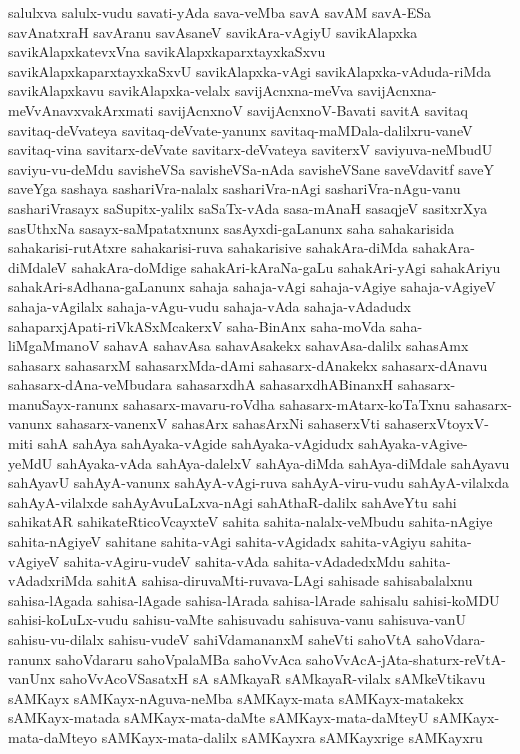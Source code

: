{salulxva
salulx-vudu
savati-yAda
sava-veMba
savA
savAM
savA-ESa
savAnatxraH
savAranu
savAsaneV
savikAra-vAgiyU
savikAlapxka
savikAlapxkatevxVna
savikAlapxkaparxtayxkaSxvu
savikAlapxkaparxtayxkaSxvU
savikAlapxka-vAgi
savikAlapxka-vAduda-riMda
savikAlapxkavu
savikAlapxka-velalx
savijAcnxna-meVva
savijAcnxna-meVvAnavxvakArxmati
savijAcnxnoV
savijAcnxnoV-Bavati
savitA
savitaq
savitaq-deVvateya
savitaq-deVvate-yanunx
savitaq-maMDala-dalilxru-vaneV
savitaq-vina
savitarx-deVvate
savitarx-deVvateya
saviterxV
saviyuva-neMbudU
saviyu-vu-deMdu
savisheVSa
savisheVSa-nAda
savisheVSane
saveVdavitf
saveY
saveYga
sashaya
sashariVra-nalalx
sashariVra-nAgi
sashariVra-nAgu-vanu
sashariVrasayx
saSupitx-yalilx
saSaTx-vAda
sasa-mAnaH
sasaqjeV
sasitxrXya
sasUthxNa
sasayx-saMpatatxnunx
sasAyxdi-gaLanunx
saha
sahakarisida
sahakarisi-rutAtxre
sahakarisi-ruva
sahakarisive
sahakAra-diMda
sahakAra-diMdaleV
sahakAra-doMdige
sahakAri-kAraNa-gaLu
sahakAri-yAgi
sahakAriyu
sahakAri-sAdhana-gaLanunx
sahaja
sahaja-vAgi
sahaja-vAgiye
sahaja-vAgiyeV
sahaja-vAgilalx
sahaja-vAgu-vudu
sahaja-vAda
sahaja-vAdadudx
sahaparxjApati-riVkASxMcakerxV
saha-BinAnx
saha-moVda
saha-liMgaMmanoV
sahavA
sahavAsa
sahavAsakekx
sahavAsa-dalilx
sahasAmx
sahasarx
sahasarxM
sahasarxMda-dAmi
sahasarx-dAnakekx
sahasarx-dAnavu
sahasarx-dAna-veMbudara
sahasarxdhA
sahasarxdhABinanxH
sahasarx-manuSayx-ranunx
sahasarx-mavaru-roVdha
sahasarx-mAtarx-koTaTxnu
sahasarx-vanunx
sahasarx-vanenxV
sahasArx
sahasArxNi
sahaserxVti
sahaserxVtoyxV-miti
sahA
sahAya
sahAyaka-vAgide
sahAyaka-vAgidudx
sahAyaka-vAgive-yeMdU
sahAyaka-vAda
sahAya-dalelxV
sahAya-diMda
sahAya-diMdale
sahAyavu
sahAyavU
sahAyA-vanunx
sahAyA-vAgi-ruva
sahAyA-viru-vudu
sahAyA-vilalxda
sahAyA-vilalxde
sahAyAvuLaLxva-nAgi
sahAthaR-dalilx
sahAveYtu
sahi
sahikatAR
sahikateRticoVcayxteV
sahita
sahita-nalalx-veMbudu
sahita-nAgiye
sahita-nAgiyeV
sahitane
sahita-vAgi
sahita-vAgidadx
sahita-vAgiyu
sahita-vAgiyeV
sahita-vAgiru-vudeV
sahita-vAda
sahita-vAdadedxMdu
sahita-vAdadxriMda
sahitA
sahisa-diruvaMti-ruvava-LAgi
sahisade
sahisabalalxnu
sahisa-lAgada
sahisa-lAgade
sahisa-lArada
sahisa-lArade
sahisalu
sahisi-koMDU
sahisi-koLuLx-vudu
sahisu-vaMte
sahisuvadu
sahisuva-vanu
sahisuva-vanU
sahisu-vu-dilalx
sahisu-vudeV
sahiVdamananxM
saheVti
sahoVtA
sahoVdara-ranunx
sahoVdararu
sahoVpalaMBa
sahoVvAca
sahoVvAcA-jAta-shaturx-reVtA-vanUnx
sahoVvAcoVSasatxH
sA
sAMkayaR
sAMkayaR-vilalx
sAMkeVtikavu
sAMKayx
sAMKayx-nAguva-neMba
sAMKayx-mata
sAMKayx-matakekx
sAMKayx-matada
sAMKayx-mata-daMte
sAMKayx-mata-daMteyU
sAMKayx-mata-daMteyo
sAMKayx-mata-dalilx
sAMKayxra
sAMKayxrige
sAMKayxru
}
